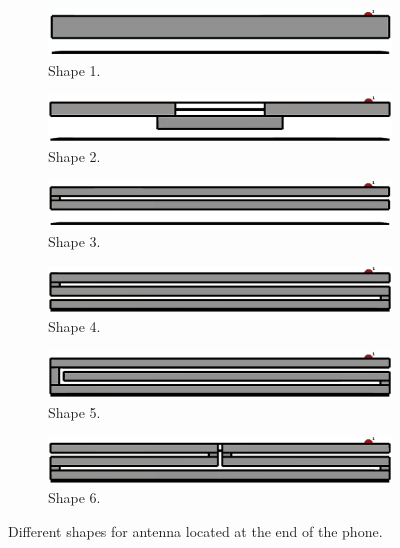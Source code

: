 \begin{figure}[H]
    \centering
    \begin{subfigure}[b]{0.49\textwidth}
        \includegraphics[width=\textwidth]{img/shape1.eps}
        \caption{Shape 1.}
        \label{fig:shape1}
    \end{subfigure}
    \begin{subfigure}[b]{0.49\textwidth}
        \includegraphics[width=\textwidth]{img/shape2.eps}
        \caption{Shape 2.}
        \label{fig:shape2}
    \end{subfigure}
    
    \begin{subfigure}[b]{0.49\textwidth}
        \includegraphics[width=\textwidth]{img/shape3.eps}
        \caption{Shape 3.}
        \label{fig:shape3}
    \end{subfigure}
    \begin{subfigure}[b]{0.49\textwidth}
        \includegraphics[width=\textwidth]{img/shape4.eps}
        \caption{Shape 4.}
        \label{fig:shape4}
    \end{subfigure}
    
    \begin{subfigure}[b]{0.49\textwidth}
        \includegraphics[width=\textwidth]{img/shape5.eps}
        \caption{Shape 5.}
        \label{fig:shape5}
    \end{subfigure}
    \begin{subfigure}[b]{0.49\textwidth}
        \includegraphics[width=\textwidth]{img/shape6.eps}
        \caption{Shape 6.}
        \label{fig:shape6}
    \end{subfigure}
    \caption{Different shapes for antenna located at the end of the phone.}
    \label{fig:shape_models}
\end{figure}

